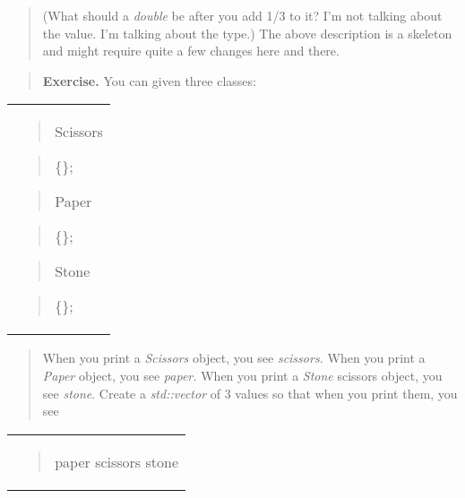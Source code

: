 \documentclass[
]{article}
\begin{document}
\begin{quote}
(What should a \emph{double} be after you add 1/3 to it? I'm not talking
about the value. I'm talking about the type.) The above description is a
skeleton and might require quite a few changes here and there.
\end{quote}

\begin{quote}
\end{quote}

\begin{quote}
\end{quote}

\begin{quote}
\textbf{Exercise. }You can given three classes:
\end{quote}

\begin{longtable}[]{@{}
  >{\raggedright\arraybackslash}p{}@{}}
\toprule\noalign{}
 \\
\midrule\noalign{}
\endhead
\bottomrule\noalign{}
\endlastfoot
\begin{quote}
Scissors
\end{quote}

\begin{quote}
\{\};
\end{quote}

\begin{quote}
Paper
\end{quote}

\begin{quote}
\{\};
\end{quote}

\begin{quote}
Stone
\end{quote}

\begin{quote}
\{\};
\end{quote} \\
\end{longtable}

\begin{quote}
When you print a \emph{Scissors} object, you see \emph{scissors. }When
you print a \emph{Paper} object, you see \emph{paper. }When you print a
\emph{Stone} scissors object, you see \emph{stone}. Create a
\emph{std::vector} of 3 values so that when you print them, you see
\end{quote}

\begin{longtable}[]{@{}
  >{\raggedright\arraybackslash}p{}@{}}
\toprule\noalign{}
 \\
\midrule\noalign{}
\endhead
\bottomrule\noalign{}
\endlastfoot
\begin{quote}
paper scissors stone
\end{quote} \\
\end{longtable}
\end{document}
